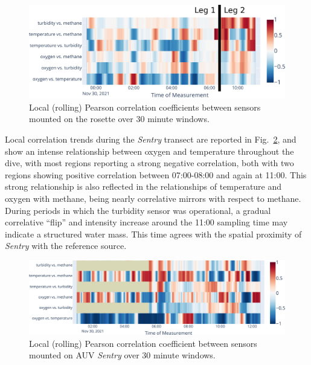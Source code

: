\begin{figure}[h!]
    \centering
    \includegraphics[width=\columnwidth]{figures/chap3_rosette_local_corr_all.jpg}
    \caption{Local (rolling) Pearson correlation coefficients between sensors mounted on the rosette over 30 minute windows.}
    \label{fig:rosette_local}
\end{figure}

Local correlation trends during the \emph{Sentry} transect are reported in Fig.~\ref{fig:sentry_local}, and show an intense relationship between oxygen and temperature throughout the dive, with most regions reporting a strong negative correlation, both with two regions showing positive correlation between 07:00-08:00 and again at 11:00. This strong relationship is also reflected in the relationships of temperature and oxygen with methane, being nearly correlative mirrors with respect to methane. During periods in which the turbidity sensor was operational, a gradual correlative ``flip'' and intensity increase around the 11:00 sampling time may indicate a structured water mass. This time agrees with the spatial proximity of \emph{Sentry} with the reference source.

\begin{figure}[h!]
    \centering
    \includegraphics[width=1\columnwidth]{figures/chap3_sentry_local_corr_all.jpg}
    \caption{Local (rolling) Pearson correlation coefficient between sensors mounted on AUV \emph{Sentry} over 30 minute windows.}
    \label{fig:sentry_local}
\end{figure}

